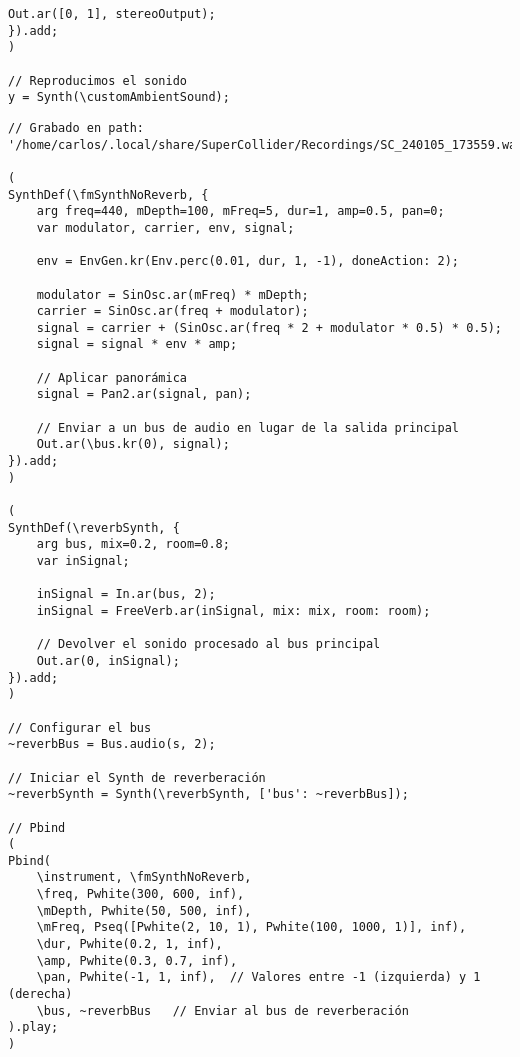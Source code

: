 \begin{minipage}[t]{1\textwidth}
\begin{lstlisting}[style=SuperCollider-IDE, basicstyle=\footnotesize\ttfamily, numbers=none]
    Out.ar([0, 1], stereoOutput);
}).add;
)

// Reproducimos el sonido
y = Synth(\customAmbientSound);                           
    \end{lstlisting}
    \vspace{1cm}
\end{minipage}





\begin{minipage}[t]{1\textwidth}
    \centering
    \begin{lstlisting}[style=SuperCollider-IDE, basicstyle=\footnotesize\ttfamily, numbers=none]
// Grabado en path: '/home/carlos/.local/share/SuperCollider/Recordings/SC_240105_173559.wav'

(
SynthDef(\fmSynthNoReverb, {
    arg freq=440, mDepth=100, mFreq=5, dur=1, amp=0.5, pan=0;
    var modulator, carrier, env, signal;

    env = EnvGen.kr(Env.perc(0.01, dur, 1, -1), doneAction: 2);

    modulator = SinOsc.ar(mFreq) * mDepth;
    carrier = SinOsc.ar(freq + modulator);
    signal = carrier + (SinOsc.ar(freq * 2 + modulator * 0.5) * 0.5);
    signal = signal * env * amp;

    // Aplicar panorámica
    signal = Pan2.ar(signal, pan);

    // Enviar a un bus de audio en lugar de la salida principal
    Out.ar(\bus.kr(0), signal);
}).add;
)

(
SynthDef(\reverbSynth, {
    arg bus, mix=0.2, room=0.8;
    var inSignal;

    inSignal = In.ar(bus, 2);
    inSignal = FreeVerb.ar(inSignal, mix: mix, room: room);

    // Devolver el sonido procesado al bus principal
    Out.ar(0, inSignal);
}).add;
)

// Configurar el bus
~reverbBus = Bus.audio(s, 2);

// Iniciar el Synth de reverberación
~reverbSynth = Synth(\reverbSynth, ['bus': ~reverbBus]);

// Pbind
(
Pbind(
    \instrument, \fmSynthNoReverb,
    \freq, Pwhite(300, 600, inf),
    \mDepth, Pwhite(50, 500, inf),
    \mFreq, Pseq([Pwhite(2, 10, 1), Pwhite(100, 1000, 1)], inf),
    \dur, Pwhite(0.2, 1, inf),
    \amp, Pwhite(0.3, 0.7, inf),
    \pan, Pwhite(-1, 1, inf),  // Valores entre -1 (izquierda) y 1 (derecha)
    \bus, ~reverbBus   // Enviar al bus de reverberación
).play;
)                                
    \end{lstlisting}
    \vspace{1cm}
\end{minipage}
